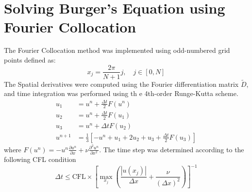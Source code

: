 \section{Solving Burger’s Equation using Fourier Collocation}
The Fourier Collocation method was implemented using odd-numbered grid points defined as:
\begin{equation}
	x_j = \frac{2\pi}{N+1}j, \quad j \in [0, N]
\end{equation}
The Spatial derivatives were computed using the Fourier differentiation matrix $\tilde{D}$, and time integration was performed using th e 4th-order Runge-Kutta scheme.
\begin{equation}
	\begin{align}
		u_1     & = u^n + \frac{\Delta t}{2}F(u^n)                                             \\
		u_2     & = u^n + \frac{\Delta t}{2}F(u_1)                                             \\
		u_3     & = u^n + \Delta t F(u_2)                                                      \\
		u^{n+1} & = \frac{1}{3}\left[-u^n + u_1 + 2u_2 + u_3 + \frac{\Delta t}{2}F(u_3)\right]
	\end{align}
	\label{eq:}
\end{equation}
where $F(u^n) = -u^n\frac{\partial u^n}{\partial x} + \nu\frac{\partial^2 u^n}{\partial x^2}$.\newline
The time step was determined according to the following CFL condition
\begin{equation}
	\Delta t \leq \text{CFL} \times \left[\max_{x_j} \left(\frac{|u(x_j)|}{\Delta x} + \frac{\nu}{(\Delta x)^2}\right) \right]^{-1}
\end{equation}
